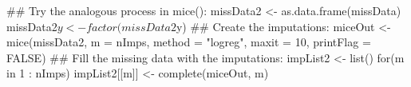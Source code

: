 \begin{Schunk}
\begin{Sinput}
 ## Try the analogous process in mice():
 missData2 <- as.data.frame(missData)
 missData2$y <- factor(missData2$y)
 ## Create the imputations:
 miceOut <- mice(missData2,
                 m = nImps,
                 method = "logreg",
                 maxit = 10,
                 printFlag = FALSE)
 ## Fill the missing data with the imputations:
 impList2 <- list()
 for(m in 1 : nImps) impList2[[m]] <- complete(miceOut, m)
\end{Sinput}
\end{Schunk}
